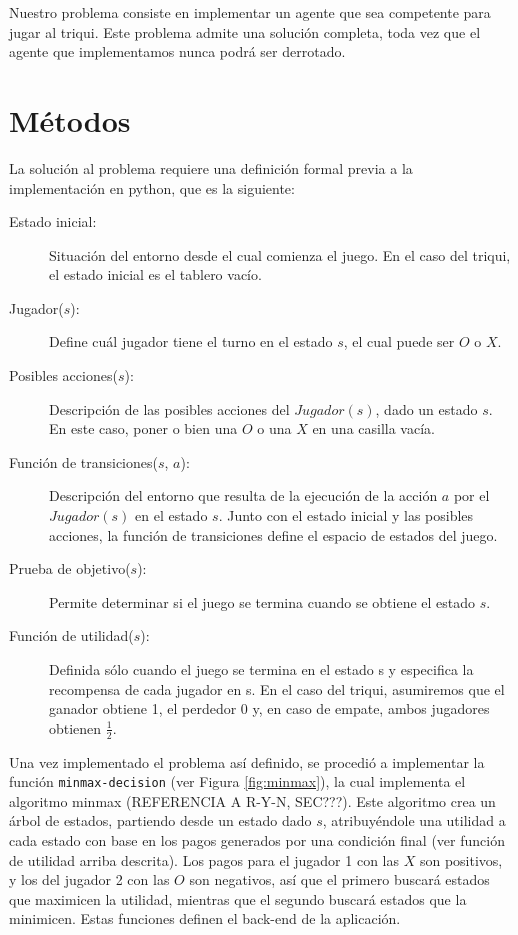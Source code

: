 \documentclass[11pt]{article}
\begin{document}
Nuestro problema consiste en implementar un agente que sea competente para jugar al triqui. Este problema admite una solución completa, toda vez que el agente que implementamos nunca podrá ser derrotado. 

\section{Métodos}

\noindent La solución al problema requiere una definición formal previa a la implementación en python, que es la siguiente:

\begin{description}
\item[Estado inicial:] Situación del entorno desde el cual comienza el juego. En el caso del triqui, el estado inicial es el tablero vacío.
\item[Jugador($s$):] Define cuál jugador tiene el turno en el estado $s$, el cual puede ser $O$ o $X$.
\item[Posibles acciones($s$):] Descripción de las posibles acciones del $Jugador(s)$, dado un estado $s$. En este caso, poner o bien una $O$ o una $X$ en una casilla vacía.
\item[Función de transiciones($s$, $a$):] Descripción del entorno que resulta de la ejecución de la acción $a$ por el $Jugador(s)$ en el estado $s$. Junto con el estado inicial y las posibles acciones, la función de transiciones define el espacio de estados del juego.
\item[Prueba de objetivo($s$):] Permite determinar si el juego se termina cuando se obtiene el estado $s$.
\item[Función de utilidad($s$):] Definida sólo cuando el juego se termina en el estado s y especifica la recompensa de cada jugador en s. En el caso del triqui, asumiremos que el ganador obtiene 1, el perdedor 0 y, en caso de empate, ambos jugadores obtienen $\frac{1}{2}$.
\end{description}

Una vez implementado el problema así definido, se procedió a implementar la función \texttt{minmax-decision} (ver Figura \ref{fig:minmax}), la cual implementa el algoritmo minmax (REFERENCIA A R-Y-N, SEC???). Este algoritmo crea un árbol de estados, partiendo desde un estado dado $s$, atribuyéndole una utilidad a cada estado con base en los pagos generados por una condición final (ver función de utilidad arriba descrita). Los pagos para el jugador 1 con las $X$ son positivos, y los del jugador 2 con las $O$ son negativos, así que el primero buscará estados que maximicen la utilidad, mientras que el segundo buscará estados que la minimicen. Estas funciones definen el back-end de la aplicación.
\end{document}
